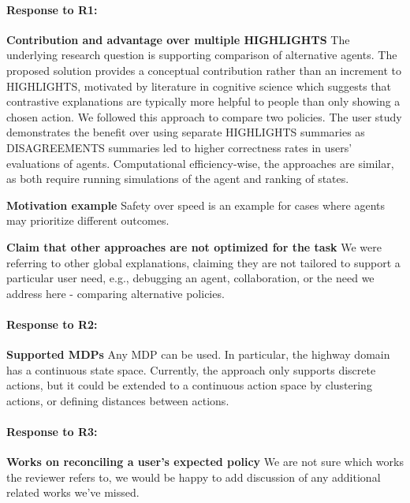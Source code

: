 \paragraph{Response to R1:}
\textbf{Contribution and advantage over multiple HIGHLIGHTS}
The underlying research question is supporting comparison of alternative agents. The proposed solution provides a conceptual contribution rather than an increment to  HIGHLIGHTS,  motivated by literature in cognitive science which suggests that contrastive explanations are typically more helpful to people than only showing a chosen action. We followed this approach to compare two policies.
The user study demonstrates the benefit over using separate HIGHLIGHTS summaries as DISAGREEMENTS summaries led to higher correctness rates in users' evaluations of agents.
Computational efficiency-wise, the  approaches are similar, as both require running simulations of the agent and ranking of states. 

\textbf{Motivation example}
Safety over speed is an example for cases where agents may prioritize different outcomes.


\textbf{Claim that other approaches are not optimized for the task}
We were referring to other global explanations, claiming they are not tailored to support a particular user need, e.g., debugging an agent, collaboration, or the need we address here - comparing alternative policies.

\paragraph{Response to R2:}
\textbf{Supported MDPs}
Any MDP can be used. In particular, the highway domain has a continuous state space. Currently, the approach only supports discrete actions, but it could be extended to a continuous action space by clustering actions, or defining distances between actions.


\paragraph{Response to R3:}
\textbf{Works on reconciling a user's expected policy}
We are not sure which works the reviewer refers to, we would be happy to add discussion of any additional related works we've missed. 

